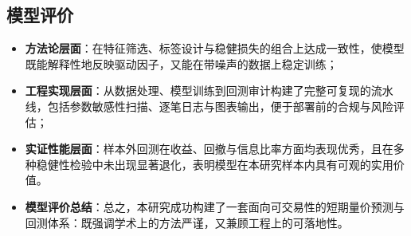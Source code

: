 \documentclass[withoutpreface,bwprint]{cumcmthesis}
\begin{document}
\subsection{模型评价}

\begin{itemize}
    \item \textbf{方法论层面}：在特征筛选、标签设计与稳健损失的组合上达成一致性，使模型既能解释性地反映驱动因子，又能在带噪声的数据上稳定训练；
    \item \textbf{工程实现层面}：从数据处理、模型训练到回测审计构建了完整可复现的流水线，包括参数敏感性扫描、逐笔日志与图表输出，便于部署前的合规与风险评估；
    \item \textbf{实证性能层面}：样本外回测在收益、回撤与信息比率方面均表现优秀，且在多种稳健性检验中未出现显著退化，表明模型在本研究样本内具有可观的实用价值。
    \item \textbf{模型评价总结}：总之，本研究成功构建了一套面向可交易性的短期量价预测与回测体系：既强调学术上的方法严谨，又兼顾工程上的可落地性。
\end{itemize}
\end{document}
